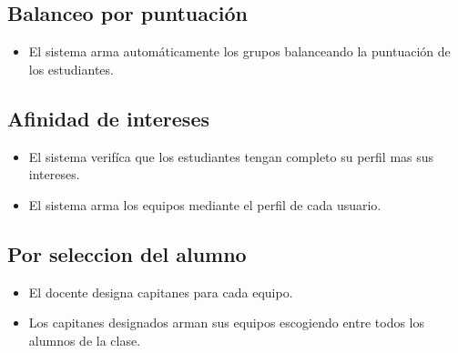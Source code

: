 \documentclass[letterpaper,spanish]{article}
\begin{document}
\subsection{Balanceo por puntuaci\'on}
\begin{itemize}
    \item El sistema arma autom\'aticamente los grupos balanceando la puntuaci\'on de los estudiantes.
\end{itemize}

\subsection{Afinidad de intereses}
\begin{itemize}
    \item El sistema verif\'ica que los estudiantes tengan completo su perfil mas sus intereses.
    \item El sistema arma los equipos mediante el perfil de cada usuario.
\end{itemize}

\subsection{Por seleccion del alumno}
\begin{itemize}
    \item El docente designa capitanes para cada equipo.
    \item Los capitanes designados arman sus equipos escogiendo entre todos los alumnos de la clase.
\end{itemize}

\end{document}
